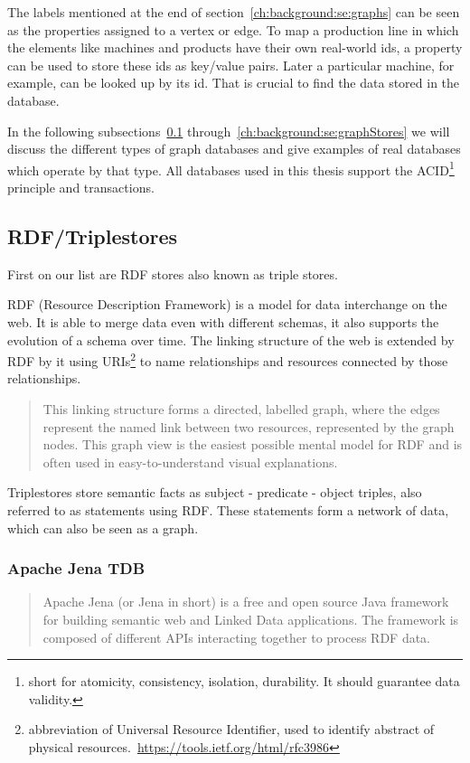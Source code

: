 The labels mentioned at the end of section~\ref{ch:background:se:graphs} can be seen as the properties assigned to a vertex or edge.
To map a production line in which the elements like machines and products have their own real-world ids,
a property can be used to store these ids as key/value pairs.
Later a particular machine,
for example,
can be looked up by its id.
That is crucial to find the data stored in the database.

In the following subsections~\ref{ch:background:se:rdfTriplestores} through~\ref{ch:background:se:graphStores} we will discuss the different types of graph databases and give examples of real databases which operate by that type.
All databases used in this thesis support the ACID\footnote{short for atomicity, consistency, isolation, durability. It should guarantee data validity.} principle and transactions.

\subsection{RDF/Triplestores}
\label{ch:background:se:rdfTriplestores}
First on our list are RDF stores also known as triple stores.

RDF (Resource Description Framework) is a model for data interchange on the web.
It is able to merge data even with different schemas, it also supports the evolution of a schema over time.
The linking structure of the web is extended by RDF by it using URIs\footnote{abbreviation of Universal Resource Identifier, used to identify abstract of physical resources.~\url{https://tools.ietf.org/html/rfc3986}} to name relationships and resources connected by those relationships.~\cite[4]{Ontotext2014}

\blockquote[\cite{W3C2014}]{This linking structure forms a directed, labelled graph, where the edges represent the named link between two resources, represented by the graph nodes.
This graph view is the easiest possible mental model for RDF and is often used in easy-to-understand visual explanations.}

Triplestores store semantic facts as subject - predicate - object triples,
also referred to as statements using RDF.
These statements form a network of data,
which can also be seen as a graph.~\cite[4]{Ontotext2014}

\subsubsection{Apache Jena TDB}
\label{ch:background:se:apacheJena}
\blockquote[\cite{Apache2015}]{Apache Jena (or Jena in short) is a free and open source Java framework for building semantic web and Linked Data applications.
The framework is composed of different APIs interacting together to process RDF data.}

